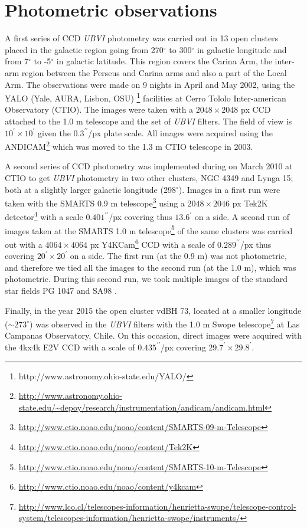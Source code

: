 \documentclass[draft]{aa}
\begin{document}
\section{Photometric observations}
\label{sec:photo_obs}

A first series of CCD \emph{UBVI} photometry was carried out in 13 open clusters
placed in the galactic region going from 270$^\circ$ to 300$^\circ$ in galactic
longitude and from 7$^\circ$ to -5$^\circ$ in galactic latitude. This region
covers the Carina Arm, the inter-arm region between the Perseus and Carina arms
and also a part of the Local Arm.
%
The observations were made on 9 nights in April and May 2002, using the YALO
(Yale, AURA, Lisbon, OSU)
\footnote{http://www.astronomy.ohio-state.edu/YALO/}
facilities at Cerro Tololo Inter-american
Observatory (CTIO). The images were taken with a $2048\times2048$ px CCD
attached to the 1.0 m telescope and the set of \textit{UBVI} filters.
The field of view is $10^\prime\times10^\prime$ given the
$0.3^{\prime\prime}$/px plate scale. All images were acquired using the
ANDICAM\footnote{\url{http://www.astronomy.ohio-state.edu/~depoy/research/instrumentation/andicam/andicam.html}}
which was moved to the 1.3 m CTIO telescope in 2003.

A second series of CCD photometry was implemented during on March 2010 at CTIO
to get \textit{UBVI} photometry in two other clusters,
NGC 4349 and Lynga 15; both at a slightly larger galactic longitude 
(298$^\circ$). Images in a first run were taken with the
SMARTS 0.9 m telescope\footnote{
\url{http://www.ctio.noao.edu/noao/content/SMARTS-09-m-Telescope}}
using a $2048\times2046$ px Tek2K
detector\footnote{\url{http://www.ctio.noao.edu/noao/content/Tek2K}} with a
scale $0.401^{\prime\prime}$/px covering thus $13.6^{\prime}$ on a side. A
second run of images taken at the SMARTS 1.0 m telescope\footnote{
\url{http://www.ctio.noao.edu/noao/content/SMARTS-10-m-Telescope}}
of the same clusters was carried out with a $4064\times4064$ px
Y4KCam\footnote{\url{http://www.ctio.noao.edu/noao/content/y4kcam}}
CCD with a scale of $0.289^{\prime\prime}$/px thus covering
$20^\prime\times20^\prime$ on a side.
%
The first run (at the 0.9 m) was not photometric, and therefore we tied all
the images to the second run (at the 1.0 m), which was photometric. During
this second run, we took multiple images of the standard star fields PG 1047
and SA98 \citep{1992AJ....104..340L}.

Finally, in the year 2015 the open cluster vdBH 73, located at a smaller
longitude ($\sim 273^\circ$) was observed in the \textit{UBVI} filters with the
1.0 m Swope telescope\footnote{\url{http://www.lco.cl/telescopes-information/henrietta-swope/telescope-control-system/telescopes-information/henrietta-swope/instruments/}}
at Las Campanas Observatory, Chile. On this occasion,
direct images were acquired with the 4kx4k E2V CCD with a scale of
$0.435^{\prime\prime}$/px covering $29.7^\prime\times29.8^\prime$.\\
\end{document}
